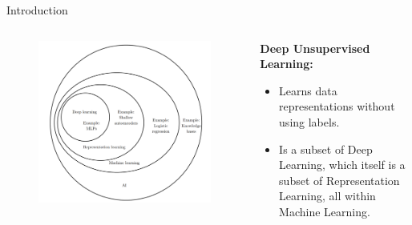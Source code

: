 \begin{frame}[allowframebreaks]{Introduction}
    \begin{columns}
    \begin{column}{0.7\textwidth}
        \begin{figure}
            \flushleft
            \includegraphics[width=\linewidth,height=0.8\textheight,keepaspectratio]{images/ssl/slide_3_1_img.png}
        \end{figure}
    \end{column}
    \begin{column}{0.48\textwidth}
        \textbf{Deep Unsupervised Learning:}
        \begin{itemize}
            \item Learns data representations without using labels.
            \item Is a subset of Deep Learning, which itself is a subset of Representation Learning, all within Machine Learning.
        \end{itemize}
    \end{column}
    \end{columns} 
    
    \framebreak


\end{frame}
